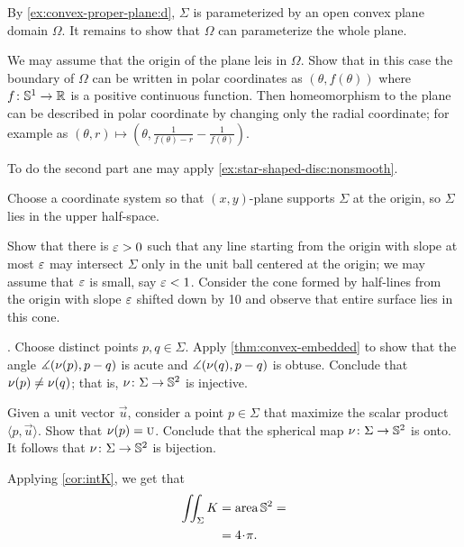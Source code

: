 

By \ref{ex:convex-proper-plane:d}, $\Sigma$ is parameterized by an open convex plane domain $\Omega$.
It remains to show that $\Omega$ can parameterize the whole plane.

We may assume that the origin of the plane leis in $\Omega$.
Show that in this case the boundary of $\Omega$ can be written in polar coordinates as $(\theta,f(\theta))$ where $f\colon\mathbb{S}^1\to\mathbb{R}$ is a positive continuous function.
Then homeomorphism to the plane can be described in polar coordinate by changing only the radial coordinate;
for example as 
$(\theta,r)\mapsto (\theta,
\tfrac1{f(\theta)-r}-\tfrac1{f(\theta)})$.

To do the second part ane may apply \ref{ex:star-shaped-disc:nonsmooth}.


Choose a coordinate system so that $(x,y)$-plane supports $\Sigma$ at the origin, so $\Sigma$ lies in the upper half-space.

Show that there is $\varepsilon>0$ such that any line starting from the origin with slope at most $\varepsilon$ may intersect $\Sigma$ only in the unit ball centered at the origin;
we may assume that $\varepsilon$ is small, say $\varepsilon<1$.
Consider the cone formed by half-lines from the origin with slope $\varepsilon$ shifted down by 10 and observe that entire surface lies in this cone.



\parbf{\ref{ex:intK}}.
Choose distinct points $p,q\in\Sigma$.
Apply \ref{thm:convex-embedded} to show that the angle 
$\measuredangle(\nu(p),p-q)$ is acute and $\measuredangle(\nu(q),p-q)$ is obtuse.
Conclude that $\nu(p)\ne\nu(q)$;
that is, $\nu\colon\Sigma\to\mathbb{S}^2$ is injective.


Given a unit vector $\vec u$, consider a point $p\in \Sigma$ that maximize the scalar product $\langle p,\vec u\rangle$.
Show that $\nu(p)=\textsc u$.
Conclude that the spherical map $\nu\colon\Sigma\to\mathbb{S}^2$ is onto.
It follows that $\nu\colon\Sigma\to\mathbb{S}^2$ is bijection.

Applying \ref{cor:intK}, we get that 
\begin{align*}
\iint_\Sigma K&=\area\mathbb{S}^2=
\\
&=4\cdot\pi.
\end{align*}

